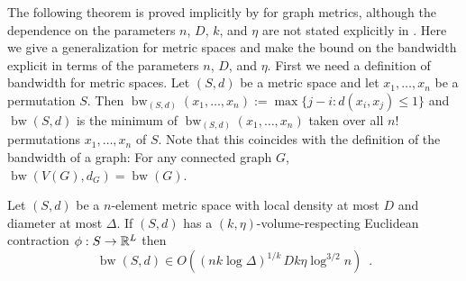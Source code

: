 \documentclass{patmorin}
\renewcommand{\ge}{\geqslant}
\renewcommand{\le}{\leqslant}
\DeclareMathOperator{\bw}{bw}
\begin{document}
The following theorem is proved implicitly by \citet{feige:approximating} for graph metrics, although the dependence on the parameters $n$, $D$, $k$, and $\eta$ are not stated explicitly in \cite{feige:approximating}. Here we give a generalization for metric spaces and make the bound on the bandwidth explicit in terms of the parameters $n$, $D$, and $\eta$.  First we need a definition of bandwidth for metric spaces.  Let $(S,d)$ be a metric space and let $x_1,\ldots,x_n$ be a permutation $S$.  Then $\bw_{(S,d)}(x_1,\ldots,x_n):=\max\{j-i:d(x_i,x_j)\le 1\}$ and $\bw(S,d)$ is the minimum of $\bw_{(S,d)}(x_1,\ldots,x_n)$ taken over all $n!$ permutations $x_1,\ldots,x_n$ of $S$.  Note that this coincides with the definition of the bandwidth of a graph: For any connected graph $G$, $\bw(V(G),d_G)=\bw(G)$.




\begin{thm}\label{volume_density_bandwidth}
  Let $(S,d)$ be a $n$-element metric space with local density at most $D$ and diameter at most $\Delta$.  If $(S,d)$ has a $(k,\eta)$-volume-respecting Euclidean contraction $\phi:S\to\mathbb{R}^L$
  then
  \[
    \bw(S,d) \in O((nk\log\Delta)^{1/k}\,Dk\eta\log^{3/2} n) \enspace .
  \]
\end{thm}

\end{document}
